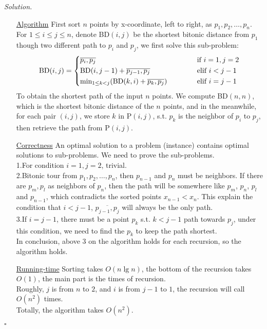 \documentclass[11pt]{article}
\theoremstyle{definition}
\newenvironment{solution}{\noindent\emph{Solution.}}{\hfill$\square$}
\newcommand\tab[1][1cm]{\hspace*{#1}}
\begin{document}
\begin{solution}
\begin{enumerate}
    \item[\underline{Algorithm}]
First sort $n$ points by x-coordinate, left to right, as $p_1, p_2, \ldots, p_n$.\\
For $1\leq i \leq j \leq n$, denote BD$(i, j)$ be the shortest bitonic distance from $p_1$ though two different path to $p_i$ and $p_j$, we first solve this sub-problem:
 $$
   \mbox{BD}(i,j) = \left \{
   \begin{aligned}
   &\overline{p_i, p_j} \tab & &\mbox{ if } i = 1, j = 2 \\
   &\mbox{BD}(i, j-1) + \overline{p_{j-1},p_j}  \tab & &\mbox{ elif }  i<j-1 \\
   &\mbox{min}_{1 \leq k<j}(\mbox{BD}(k,i) + \overline{p_k,p_j})  \tab & &\mbox{ elif }  i=j-1
   \end{aligned}
   \right.
   $$
   To obtain the shortest path of the input $n$ points. We compute BD$(n,n)$, which is the shortest bitonic distance of the $n$ points, and in the meanwhile, for each pair $(i,j)$, we store $k$ in P$(i,j)$, s.t. $p_k$ is the neighbor of $p_i$ to $p_j$, then retrieve the path from P$(i,j)$.




 \item[\underline{Correctness}] An optimal solution to a problem (instance) contains
optimal solutions to sub-problems. We need to prove the sub-problems.\\
\tab 1.For condition $i = 1, j = 2$, trivial.\\
\tab 2.Bitonic tour from $p_1, p_2, \ldots, p_n$, then $p_{n-1}$ and $p_n$ must be neighbors. If there are $p_m, p_l$ as neighbors of $p_n$, then the path will be somewhere like $p_m$, $p_{n}$, $p_l$ and $p_{n-1}$, which contradicts the sorted points $x_{n-1} < x_n$. This explain the condition that $i<j-1$, $\overline{p_{j-1},p_j}$ will always be the only path.\\
\tab 3.If $i = j-1$, there must be a point $p_k$ s.t. $k<j-1$ path towards $p_j$, under this condition, we need to find the $p_k$ to keep the path shortest. \\
\tab In conclusion, above 3 on the algorithm holds for each recursion, so the algorithm holds.

 \item[\underline{Running-time}]
Sorting takes $O(n \lg n)$, the bottom of the recursion takes $O(1)$, the main part is the times of recursion.\\
Roughly, $j$ is from $n$ to $2$, and $i$ is from $j-1$ to $1$, the recursion will call $O(n^2)$ times.\\
Totally, the algorithm takes $O(n^2)$.
    
    
\end{enumerate}

\end{solution}
\end{document}
